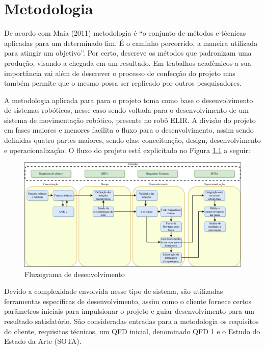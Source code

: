 \chapter{Metodologia}
\label{chap:meto}
De acordo com Maia (2011) metodologia é “o conjunto de métodos e técnicas aplicadas para um determinado fim. É o caminho percorrido, a maneira utilizada para atingir um objetivo”. Por certo, descreve os métodos que padronizam uma produção, visando a chegada em um resultado. Em trabalhos acadêmicos a sua importância vai além de descrever o processo de confecção do projeto mas também permite que o mesmo possa ser replicado por outros pesquisadores.

A metodologia aplicada para para o projeto toma como base o desenvolvimento de sistemas robóticos, nesse caso sendo voltada para o desenvolvimento de um sistema de movimentação robótico, presente no robô ELIR. A divisão do projeto em fases maiores e menores facilita o fluxo para o desenvolvimento, assim sendo definidas quatro partes maiores, sendo elas: conceituação, design, desenvolvimento e operacionalização. O fluxo do projeto está explicitado no Figura \ref{fig:flux_desen} a seguir: 


\begin{figure}[!htb]
	\centering
	\includegraphics[scale=0.45]{Figures/flux_desen.png}
	\caption{Fluxograma de desenvolvimento}
	\label{fig:flux_desen}
\end{figure}

Devido a complexidade envolvida nesse tipo de sistema, são utilizadas ferramentas específicas de desenvolvimento, assim como o cliente fornece certos parâmetros iniciais para impulsionar o projeto e guiar desenvolvimento para um resultado satisfatório. São consideradas entradas para a metodologia os requisitos do cliente, requisitos técnicos, um QFD inicial, denominado QFD 1 e o Estudo do Estado da Arte (SOTA).


